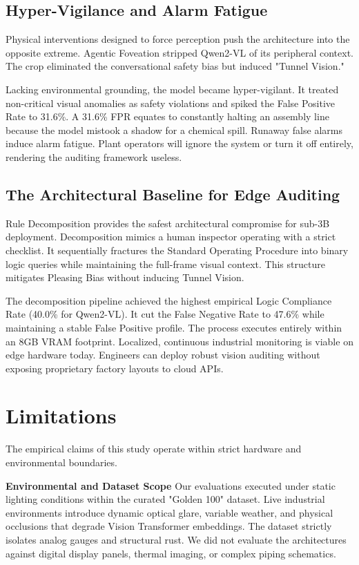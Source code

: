 \documentclass{article}
\begin{document}
\subsection*{Hyper-Vigilance and Alarm Fatigue}

Physical interventions designed to force perception push the architecture into the opposite extreme. Agentic Foveation stripped Qwen2-VL of its peripheral context. The crop eliminated the conversational safety bias but induced "Tunnel Vision." 

Lacking environmental grounding, the model became hyper-vigilant. It treated non-critical visual anomalies as safety violations and spiked the False Positive Rate to 31.6\%. A 31.6\% FPR equates to constantly halting an assembly line because the model mistook a shadow for a chemical spill. Runaway false alarms induce alarm fatigue. Plant operators will ignore the system or turn it off entirely, rendering the auditing framework useless.

\subsection*{The Architectural Baseline for Edge Auditing}

Rule Decomposition provides the safest architectural compromise for sub-3B deployment. Decomposition mimics a human inspector operating with a strict checklist. It sequentially fractures the Standard Operating Procedure into binary logic queries while maintaining the full-frame visual context. This structure mitigates Pleasing Bias without inducing Tunnel Vision. 

The decomposition pipeline achieved the highest empirical Logic Compliance Rate (40.0\% for Qwen2-VL). It cut the False Negative Rate to 47.6\% while maintaining a stable False Positive profile. The process executes entirely within an 8GB VRAM footprint. Localized, continuous industrial monitoring is viable on edge hardware today. Engineers can deploy robust vision auditing without exposing proprietary factory layouts to cloud APIs.

\section*{Limitations}


The empirical claims of this study operate within strict hardware and environmental boundaries. 

\textbf{Environmental and Dataset Scope}
Our evaluations executed under static lighting conditions within the curated "Golden 100" dataset. Live industrial environments introduce dynamic optical glare, variable weather, and physical occlusions that degrade Vision Transformer embeddings. The dataset strictly isolates analog gauges and structural rust. We did not evaluate the architectures against digital display panels, thermal imaging, or complex piping schematics.
\end{document}
